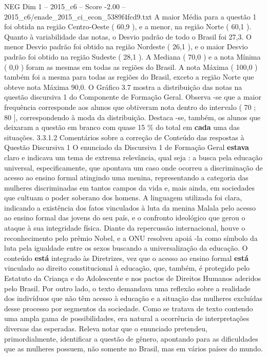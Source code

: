 \begin{textsample}{NEG Dim 1 – 2015\_c6 – Score -2.00 – 2015\_c6/enade\_2015\_ci\_econ\_5389f4fcd9.txt}
A maior Média para a questão 1 foi obtida na região Centro-Oeste ( 60,9 ), e a menor, na região Norte ( 60,1 ).
Quanto à variabilidade das notas, o Desvio padrão de todo o Brasil foi 27,3.
O menor Desvio padrão foi obtido na região Nordeste ( 26,1 ), e o maior Desvio padrão foi obtido na região Sudeste ( 28,1 ).
A Mediana ( 70,0 ) e a nota Mínima ( 0,0 ) foram as mesmas em todas as regiões do Brasil.
A nota Máxima ( 100,0 ) também foi a mesma para todas as regiões do Brasil, exceto a região Norte que obteve nota Máxima 90,0.
O Gráfico 3.7 mostra a distribuição das notas na questão discursiva 1 do Componente de Formação Geral.
Observa -se que a maior frequência corresponde aos alunos que obtiveram nota dentro do intervalo ( 70 ; 80 ], correspondendo à moda da distribuição.
Destaca -se, também, os alunos que deixaram a questão em branco com quase 15 \% do total em \textbf{cada} uma das situações. 3.3.1.2 Comentários sobre a correção de Conteúdo das respostas à Questão Discursiva 1 O enunciado da Discursiva 1 de Formação Geral \textbf{estava} claro e indicava um tema de extrema relevância, qual seja : a busca pela educação universal, especificamente, que apontava um caso onde ocorreu a discriminação de acesso ao ensino formal atingindo uma menina, representando a categoria das mulheres discriminadas em tantos campos da vida e, mais ainda, em sociedades que cultuam o poder soberano dos homens.
A linguagem utilizada foi clara, indicando a existência dos fatos vinculados à luta da menina Malala pelo acesso ao ensino formal das jovens do seu país, e o confronto ideológico que gerou o ataque à sua integridade física.
Diante da repercussão internacional, houve o reconhecimento pelo prêmio Nobel, e a ONU resolveu apoiá -la como símbolo da luta pela igualdade entre os sexos buscando a universalização da educação.
O conteúdo \textbf{está} integrado às Diretrizes, vez que o acesso ao ensino formal \textbf{está} vinculado ao direito constitucional à educação, que, também, é protegido pelo Estatuto da Criança e do Adolescente e nos pactos de Direitos Humanos aderidos pelo Brasil.
Por outro lado, o texto demandava uma reflexão sobre a realidade dos indivíduos que não têm acesso à educação e a situação das mulheres excluídas desse processo por segmentos da sociedade.
Como se tratava de texto contendo uma ampla gama de possibilidades, era natural a ocorrência de interpretações diversas das esperadas.
Releva notar que o enunciado pretendeu, primordialmente, identificar a questão de gênero, apontando para as dificuldades que as mulheres possuem, não somente no Brasil, mas em vários países do mundo.

\end{textsample}
